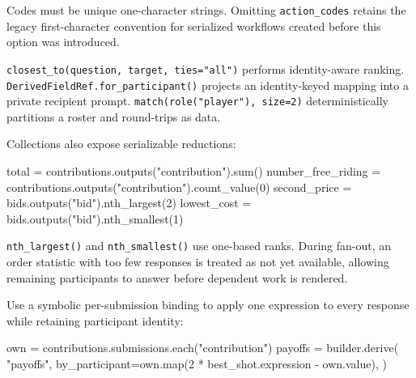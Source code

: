 \documentclass[
  10pt,
]{report}
\newenvironment{Shaded}{}{}
\newcommand{\BuiltInTok}[1]{\textcolor[rgb]{0.00,0.50,0.00}{#1}}
\newcommand{\DecValTok}[1]{\textcolor[rgb]{0.25,0.63,0.44}{#1}}
\newcommand{\NormalTok}[1]{#1}
\newcommand{\OperatorTok}[1]{\textcolor[rgb]{0.40,0.40,0.40}{#1}}
\newcommand{\StringTok}[1]{\textcolor[rgb]{0.25,0.44,0.63}{#1}}
\begin{document}
Codes must be unique one-character strings. Omitting
\texttt{action\_codes} retains the legacy first-character convention for
serialized workflows created before this option was introduced.

\texttt{closest\_to(question,\ target,\ ties="all")} performs
identity-aware ranking. \texttt{DerivedFieldRef.for\_participant()}
projects an identity-keyed mapping into a private recipient prompt.
\texttt{match(role("player"),\ size=2)} deterministically partitions a
roster and round-trips as data.

Collections also expose serializable reductions:

\begin{Shaded}
\begin{Highlighting}[]
\NormalTok{total }\OperatorTok{=}\NormalTok{ contributions.outputs(}\StringTok{"contribution"}\NormalTok{).}\BuiltInTok{sum}\NormalTok{()}
\NormalTok{number\_free\_riding }\OperatorTok{=}\NormalTok{ contributions.outputs(}\StringTok{"contribution"}\NormalTok{).count\_value(}\DecValTok{0}\NormalTok{)}
\NormalTok{second\_price }\OperatorTok{=}\NormalTok{ bids.outputs(}\StringTok{"bid"}\NormalTok{).nth\_largest(}\DecValTok{2}\NormalTok{)}
\NormalTok{lowest\_cost }\OperatorTok{=}\NormalTok{ bids.outputs(}\StringTok{"bid"}\NormalTok{).nth\_smallest(}\DecValTok{1}\NormalTok{)}
\end{Highlighting}
\end{Shaded}

\texttt{nth\_largest()} and \texttt{nth\_smallest()} use one-based
ranks. During fan-out, an order statistic with too few responses is
treated as not yet available, allowing remaining participants to answer
before dependent work is rendered.

Use a symbolic per-submission binding to apply one expression to every
response while retaining participant identity:

\begin{Shaded}
\begin{Highlighting}[]
\NormalTok{own }\OperatorTok{=}\NormalTok{ contributions.submissions.each(}\StringTok{"contribution"}\NormalTok{)}
\NormalTok{payoffs }\OperatorTok{=}\NormalTok{ builder.derive(}
    \StringTok{"payoffs"}\NormalTok{,}
\NormalTok{    by\_participant}\OperatorTok{=}\NormalTok{own.}\BuiltInTok{map}\NormalTok{(}\DecValTok{2} \OperatorTok{*}\NormalTok{ best\_shot.expression }\OperatorTok{{-}}\NormalTok{ own.value),}
\NormalTok{)}
\end{Highlighting}
\end{Shaded}
\end{document}

